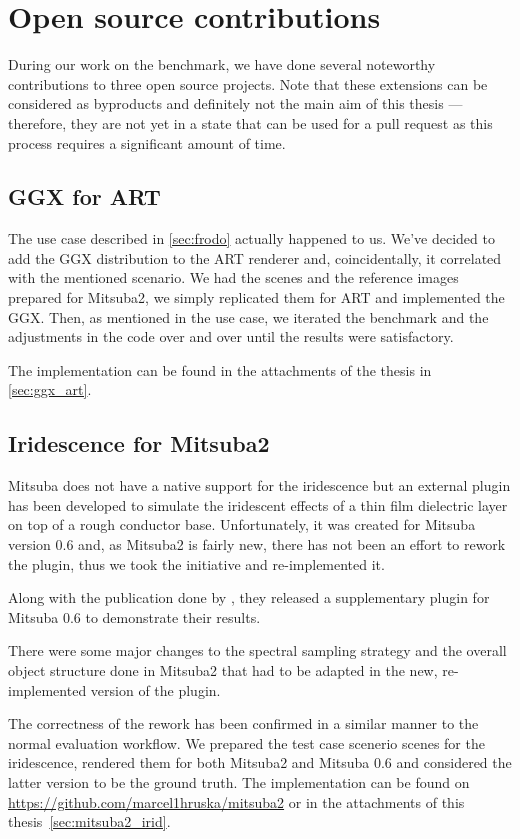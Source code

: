 \section{Open source contributions}

During our work on the benchmark, we have done several noteworthy contributions to three open source projects. Note that these extensions can be considered as byproducts and definitely not the main aim of this thesis --- therefore, they are not yet in a state that can be used for a pull request as this process requires a significant amount of time.

\subsection{GGX for ART}

The use case described in \autoref{sec:frodo} actually happened to us. We've decided to add the GGX distribution to the ART renderer and, coincidentally, it correlated with the mentioned scenario. We had the scenes and the reference images prepared for Mitsuba2, we simply replicated them for ART and implemented the GGX. Then, as mentioned in the use case, we iterated the benchmark and the adjustments in the code over and over until the results were satisfactory.

The implementation can be found in the attachments of the thesis in \autoref{sec:ggx_art}.

\subsection{Iridescence for Mitsuba2}

Mitsuba does not have a native support for the iridescence but an external plugin has been developed to simulate the iridescent effects of a thin film dielectric layer on top of a rough conductor base. Unfortunately, it was created for Mitsuba version 0.6 and, as Mitsuba2 is fairly new, there has not been an effort to rework the plugin, thus we took the initiative and re-implemented it.

Along with the publication done by \citet{belcour2017practical}, they released a supplementary plugin for Mitsuba 0.6 to demonstrate their results.

There were some major changes to the spectral sampling strategy and the overall object structure done in Mitsuba2 that had to be adapted in the new, re-implemented version of the plugin.

The correctness of the rework has been confirmed in a similar manner to the normal evaluation workflow. We prepared the test case scenerio scenes for the iridescence, rendered them for both Mitsuba2 and Mitsuba 0.6 and considered the latter version to be the ground truth. The implementation can be found on \url{https://github.com/marcel1hruska/mitsuba2} or in the attachments of this thesis~\ref{sec:mitsuba2_irid}.

